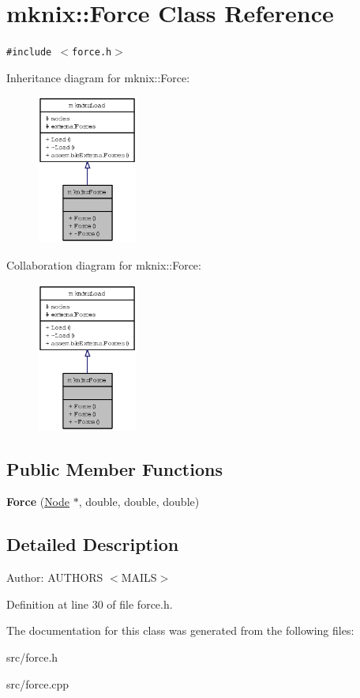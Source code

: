 \hypertarget{classmknix_1_1Force}{
\section{mknix::Force Class Reference}
\label{classmknix_1_1Force}
}
{\tt \#include $<$force.h$>$}

Inheritance diagram for mknix::Force:\nopagebreak
\begin{figure}[H]
\begin{center}
\leavevmode
\includegraphics[width=94pt]{classmknix_1_1Force__inherit__graph}
\end{center}
\end{figure}
Collaboration diagram for mknix::Force:\nopagebreak
\begin{figure}[H]
\begin{center}
\leavevmode
\includegraphics[width=94pt]{classmknix_1_1Force__coll__graph}
\end{center}
\end{figure}
\subsection*{Public Member Functions}
\begin{CompactItemize}
\item 
\hypertarget{classmknix_1_1Force_6d00b4232959ddd151e239b278423600}{
\textbf{Force} (\hyperlink{classmknix_1_1Node}{Node} $\ast$, double, double, double)}
\label{classmknix_1_1Force_6d00b4232959ddd151e239b278423600}

\end{CompactItemize}


\subsection{Detailed Description}
\begin{Desc}
\item[Author:]AUTHORS $<$MAILS$>$ \end{Desc}


Definition at line 30 of file force.h.

The documentation for this class was generated from the following files:\begin{CompactItemize}
\item 
src/force.h\item 
src/force.cpp\end{CompactItemize}
